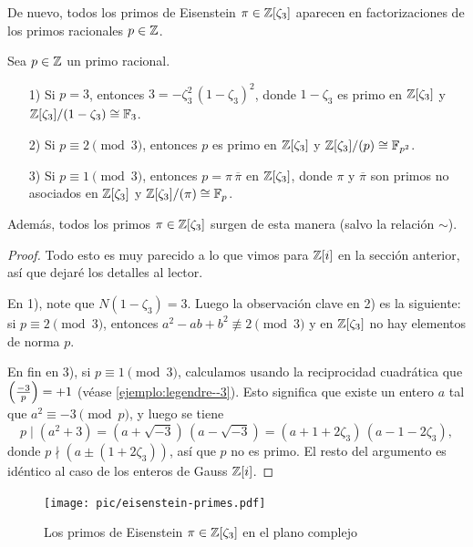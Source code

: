 De nuevo, todos los primos de Eisenstein $\pi \in \mathbb{Z} [\zeta_3]$ aparecen en
factorizaciones de los primos racionales $p \in \mathbb{Z}$.

\begin{proposicion}
  Sea $p \in \mathbb{Z}$ un primo racional.

  \begin{itemize}
  \item[1)] Si $p = 3$, entonces $3 = -\zeta_3^2\,(1-\zeta_3)^2$, donde
    $1-\zeta_3$ es primo en $\mathbb{Z} [\zeta_3]$ y
    $\mathbb{Z} [\zeta_3]/(1-\zeta_3) \cong \mathbb{F}_3$.

  \item[2)] Si $p \equiv 2 \pmod{3}$, entonces $p$ es primo en $\mathbb{Z} [\zeta_3]$
    y $\mathbb{Z} [\zeta_3]/(p) \cong \mathbb{F}_{p^2}$.

  \item[3)] Si $p \equiv 1 \pmod{3}$, entonces $p = \pi\,\overline{\pi}$
    en $\mathbb{Z} [\zeta_3]$, donde $\pi$ y $\overline{\pi}$ son primos no asociados
    en $\mathbb{Z} [\zeta_3]$ y $\mathbb{Z} [\zeta_3]/(\pi) \cong \mathbb{F}_p$.
  \end{itemize}

  Además, todos los primos $\pi \in \mathbb{Z} [\zeta_3]$ surgen de esta manera
  (salvo la relación $\sim$).

  \begin{proof}
    Todo esto es muy parecido a lo que vimos para $\mathbb{Z} [i]$ en la sección
    anterior, así que dejaré los detalles al lector.

    En 1), note que $N (1-\zeta_3) = 3$. Luego la observación clave en 2) es la
    siguiente: si $p \equiv 2 \pmod{3}$, entonces $a^2 - ab + b^2 \not\equiv
    2\pmod{3}$ y en $\mathbb{Z} [\zeta_3]$ no hay elementos de norma $p$.

    En fin en 3), si $p \equiv 1 \pmod{3}$, calculamos usando la reciprocidad
    cuadrática que $\left(\frac{-3}{p}\right) = +1$
    (véase \ref{ejemplo:legendre--3}). Esto significa que existe un entero $a$
    tal que $a^2 \equiv -3 \pmod{p}$, y luego se tiene
    \[ p \mid (a^2 + 3) = (a + \sqrt{-3})\,(a - \sqrt{-3})
           = (a + 1 + 2\zeta_3)\,(a - 1 - 2\zeta_3), \]
    donde $p \nmid (a \pm (1 + 2\zeta_3))$, así que $p$ no es primo. El resto
    del argumento es idéntico al caso de los enteros de Gauss $\mathbb{Z} [i]$.
  \end{proof}
\end{proposicion}

\begin{figure}
  \begin{center}
    \texttt{[image: pic/eisenstein-primes.pdf]}
  \end{center}

  \caption{Los primos de Eisenstein $\pi \in \mathbb{Z} [\zeta_3]$ en el plano complejo}
\end{figure}

